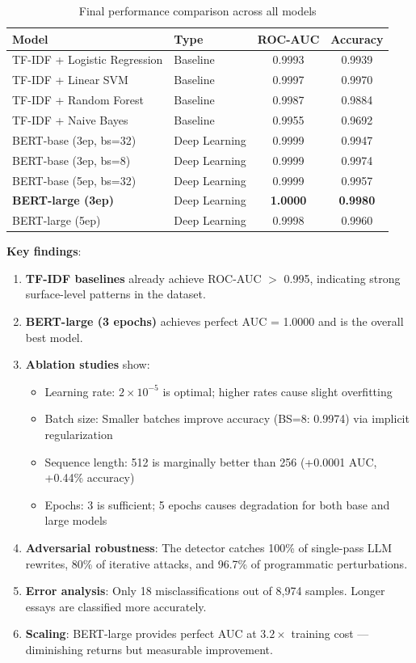 \documentclass[11pt,a4paper]{article}
\begin{document}
\begin{table}[H]
\centering
\caption{Final performance comparison across all models}
\label{tab:summary}
\begin{tabular}{llcc}
\toprule
\textbf{Model} & \textbf{Type} & \textbf{ROC-AUC} & \textbf{Accuracy} \\
\midrule
TF-IDF + Logistic Regression & Baseline        & 0.9993 & 0.9939 \\
TF-IDF + Linear SVM          & Baseline        & 0.9997 & 0.9970 \\
TF-IDF + Random Forest        & Baseline        & 0.9987 & 0.9884 \\
TF-IDF + Naive Bayes          & Baseline        & 0.9955 & 0.9692 \\
BERT-base (3ep, bs=32)        & Deep Learning   & 0.9999 & 0.9947 \\
BERT-base (3ep, bs=8)         & Deep Learning   & 0.9999 & 0.9974 \\
BERT-base (5ep, bs=32)        & Deep Learning   & 0.9999 & 0.9957 \\
\textbf{BERT-large (3ep)}     & Deep Learning   & \textbf{1.0000} & \textbf{0.9980} \\
BERT-large (5ep)              & Deep Learning   & 0.9998 & 0.9960 \\
\bottomrule
\end{tabular}
\end{table}

\textbf{Key findings}:
\begin{enumerate}
\item \textbf{TF-IDF baselines} already achieve ROC-AUC $>$ 0.995, indicating strong surface-level patterns in the dataset.
\item \textbf{BERT-large (3 epochs)} achieves perfect AUC = 1.0000 and is the overall best model.
\item \textbf{Ablation studies} show:
  \begin{itemize}[nosep]
  \item Learning rate: $2\times10^{-5}$ is optimal; higher rates cause slight overfitting
  \item Batch size: Smaller batches improve accuracy (BS=8: 0.9974) via implicit regularization
  \item Sequence length: 512 is marginally better than 256 (+0.0001 AUC, +0.44\% accuracy)
  \item Epochs: 3 is sufficient; 5 epochs causes degradation for both base and large models
  \end{itemize}
\item \textbf{Adversarial robustness}: The detector catches 100\% of single-pass LLM rewrites, 80\% of iterative attacks, and 96.7\% of programmatic perturbations.
\item \textbf{Error analysis}: Only 18 misclassifications out of 8,974 samples. Longer essays are classified more accurately.
\item \textbf{Scaling}: BERT-large provides perfect AUC at $3.2\times$ training cost --- diminishing returns but measurable improvement.
\end{enumerate}
\end{document}
